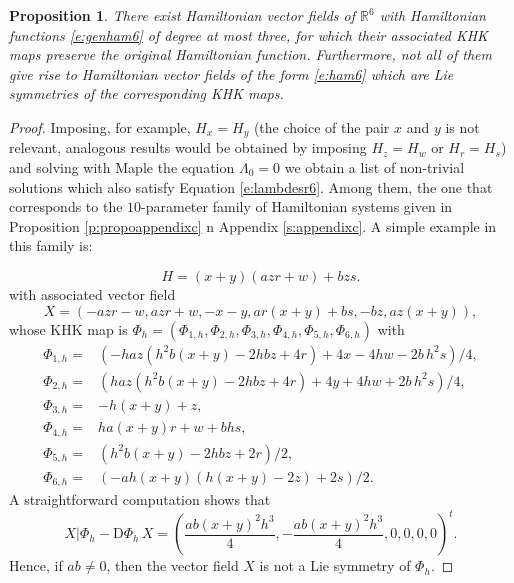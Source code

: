 \documentclass[11pt]{article}
\newtheorem {proposition} [theorem]{Proposition}
\newcommand{\R}{{\mathbb R}}
\begin{document}
\begin{proposition}\label{p:propor6}
There exist Hamiltonian vector fields of $\R^6$ with Hamiltonian functions \eqref{e:genham6} of degree at most three, for which their associated KHK maps preserve the original Hamiltonian function. Furthermore, not all of them give rise to Hamiltonian vector fields of the form \eqref{e:ham6} which are Lie symmetries of the corresponding KHK maps.
\end{proposition}







\begin{proof}
Imposing, for example, $H_x=H_y$ (the choice of the pair $x$ and $y$ is not relevant, analogous results would be obtained by imposing $H_z=H_w$ or $H_r=H_s$) and solving with Maple the equation $ \Lambda_0=0$  we obtain a list of non-trivial solutions which also satisfy Equation \eqref{e:lambdesr6}. Among them, the one that corresponds to the $10$-parameter family of Hamiltonian systems given in Proposition \ref{p:propoappendixc}  n Appendix \ref{s:appendixc}. A simple example in this family is:






\begin{equation}\label{e:hamiltoniamesnou}
H=\left(x+y\right)\left(azr+w\right)+bzs.
\end{equation}
with associated vector field 
$$X=\left(-azr-w,azr+w,-x-y,ar(x+y)+bs,-bz,az(x+y)\right),$$
whose KHK map is $\Phi_h=(\Phi _{1,h},\Phi _{2,h},\Phi _{3,h},\Phi _{4,h},\Phi _{5,h},\Phi _{6,h})$ with
\begin{align}
\Phi_{1,h}=&\left( -h a z \left(h^{2} b (x +y) -2 h b z +4 r \right) +4 x -4  h w -2  b \,h^{2} s\right)/4,\nonumber\\
\Phi_{2,h}=&\left(h a z \left(h^{2} b (x+y) -2 h b z +4 r \right)+4 y+4 h w +2 b \,h^{2} s\right)/4,\nonumber\\
\Phi_{3,h}=&-h (x+y)+z,\label{e:novaphir6}\\
\Phi_{4,h}=&h a (x+y) r +w +b h s,\nonumber\\
\Phi_{5,h}=&\left(h^{2} b (x +y) -2 h b z +2 r\right)/2,\nonumber\\
\Phi_{6,h}=&\left( -a h \left(x +y \right) \left(h (x +y) -2 z \right)+2s   \right)/2.\nonumber
\end{align}
A straightforward computation shows that 
$$X{|\Phi_h}-{\mathrm D}\Phi_h\,X=
\left( \frac{ ab \left(x +y \right)^{2}h^{3} }{4}, -\frac{ ab \left(x +y \right)^{2}h^{3} }{4} , 0 , 0 , 0 , 0 \right)^t.
$$ Hence, if  $ab\neq 0$, then the  vector field $X$ is not a Lie symmetry of $\Phi_h$. 





\end{proof}
\end{document}
